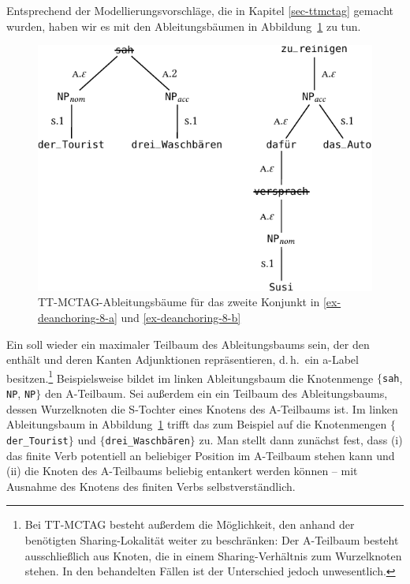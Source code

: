 Entsprechend der Modellierungsvorschläge, die in Kapitel \ref{sec-ttmctag} gemacht wurden, haben wir es mit den Ableitungsbäumen in Abbildung~\ref{fig-deanchoring-10} zu tun. 
\begin{figure}[t]
\centering
\includegraphics{graphics/abb826.pdf}
\caption{\label{fig-deanchoring-10}TT-MCTAG-Ableitungsbäume für das zweite Konjunkt in \ref{ex-deanchoring-8-a} und \ref{ex-deanchoring-8-b}}
\end{figure}
Ein  soll wieder ein maximaler Teilbaum des Ableitungsbaums sein, der den  enthält und deren Kanten Adjunktionen repräsentieren, d.\,h.\ ein {\sc a}-Label besitzen.\footnote{Bei TT-MCTAG besteht außerdem die Möglichkeit, den   anhand der benötigten Sharing-Lokalität weiter zu beschränken: Der A-Teilbaum besteht ausschlie\ss lich aus Knoten, die in einem Sharing-Verhältnis zum Wurzelknoten stehen. In den behandelten Fällen ist der Unterschied jedoch unwesentlich.} Beispielsweise bildet im linken Ableitungsbaum die Knotenmenge $\{${\tt sah}, {\tt NP\subnom}, {\tt NP\subacc}$\}$ den A-Teilbaum. Sei au\ss erdem ein  ein Teilbaum des Ableitungsbaums, dessen Wurzelknoten die S-Tochter eines Knotens des A-Teilbaums ist. Im linken Ableitungsbaum in Abbildung~\ref{fig-deanchoring-10} trifft das zum Beispiel auf die Knotenmengen $\{${\tt der\_Tourist}$\}$ und $\{${\tt drei\_Waschbären}$\}$ zu. Man stellt dann zunächst fest, dass (i) das finite Verb potentiell an beliebiger Position im A-Teilbaum stehen kann und (ii) die Knoten des A-Teilbaums beliebig entankert werden können -- mit Ausnahme des Knotens des finiten Verbs selbstverständlich. 

